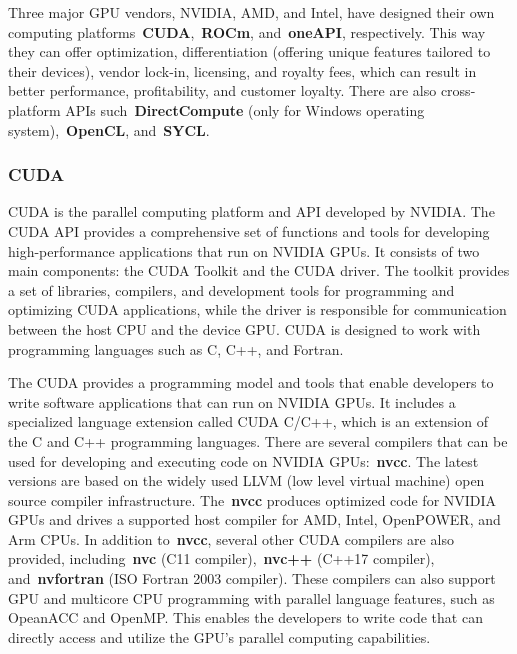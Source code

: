 \par
Three major GPU vendors, NVIDIA, AMD, and Intel, have designed their own computing platforms~\textbf{CUDA},~\textbf{ROCm}, and~\textbf{oneAPI}, respectively.
This way they can offer optimization, differentiation (offering unique features tailored to their devices), vendor lock-in, licensing, and royalty fees, which can result in better performance, profitability, and customer loyalty.
There are also cross-platform APIs such~\textbf{DirectCompute} (only for Windows operating system),~\textbf{OpenCL}, and~\textbf{SYCL}.


\subsubsection{CUDA}


\par
CUDA is the parallel computing platform and API developed by NVIDIA.
The CUDA API provides a comprehensive set of functions and tools for developing high-performance applications that run on NVIDIA GPUs.
It consists of two main components: the CUDA Toolkit and the CUDA driver.
The toolkit provides a set of libraries, compilers, and development tools for programming and optimizing CUDA applications, while the driver is responsible for communication between the host CPU and the device GPU.
CUDA is designed to work with programming languages such as C, C++, and Fortran.


\par
The CUDA provides a programming model and tools that enable developers to write software applications that can run on NVIDIA GPUs.
It includes a specialized language extension called CUDA C/C++, which is an extension of the C and C++ programming languages.
There are several compilers that can be used for developing and executing code on NVIDIA GPUs:~\textbf{nvcc}.
The latest versions are based on the widely used LLVM (low level virtual machine) open source compiler infrastructure.
The~\textbf{nvcc} produces optimized code for NVIDIA GPUs and drives a supported host compiler for AMD, Intel, OpenPOWER, and Arm CPUs.
In addition to~\textbf{nvcc}, several other CUDA compilers are also provided, including~\textbf{nvc} (C11 compiler),~\textbf{nvc++} (C++17 compiler), and~\textbf{nvfortran} (ISO Fortran 2003 compiler).
These compilers can also support GPU and multicore CPU programming with parallel language features, such as OpeanACC and OpenMP.
This enables the developers to write code that can directly access and utilize the GPU's parallel computing capabilities.



